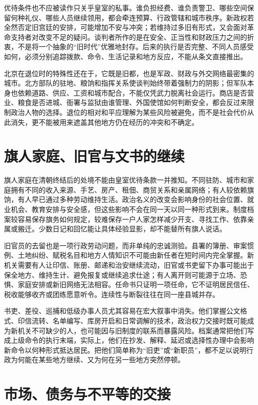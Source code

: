 优待条件也不应被读作只关乎皇室的私事。谁负担经费、谁负责警卫、哪些空间保留何种礼仪、哪些人员继续领用，都会牵连预算、行政管辖和城市秩序。新政权若全然否定旧宫廷的安排，可能增加不安与冲突；若维持过多旧有形式，又会面对革命支持者对改变不足的疑问。谈判者所作的是在安全、正当性和财政压力之间的折衷，不是将一个抽象的“旧时代”优雅地封存。后来的执行是否完整、不同人员感受如何，必须分别追踪拨款、命令、生活记录和地方反应，不能从条文直接推出。

北京在退位时的特殊性还在于，它既是旧都，也是军政、财政与外交网络最密集的城市。北方部队的驻地、粮饷和指挥关系使谈判始终带着强制力的阴影；但军队本身也依赖道路、供应、工资和城市配合，不能仅凭武力脱离社会运行。商店是否营业、粮食是否进城、衙署与监狱由谁管理、外国使馆如何判断安全，都会反过来限制政治人物的选择。退位的相对和平应理解为某些风险被避免，而不是社会代价从此消失，更不能被用来遮盖其他地方仍在经历的冲突和不确定。

\section{旗人家庭、旧官与文书的继续}

旗人家庭在清朝终结后的处境不能由皇室优待条款一并推知。不同驻防、城市和家庭拥有不同的收入来源、手艺、房产、租佃、商贸关系和亲属网络；有人较依赖旗饷，有人早已通过多种劳动维持生活。政治名义的改变会影响身份的社会位置、就业机会、教育安排与安全感，但这些影响不会在同一天以同一种形式到来。制度档案较容易保存旗务如何规定，较难保存一户人家怎样减少开支、寻找工作、依靠亲属或搬迁。少数日记和回忆能让具体经验显影，却不能替所有旗人说话。

旧官员的去留也是一项行政劳动问题，而非单纯的忠诚测验。县署的簿册、审案惯例、土地纠纷、赋税名目和地方人情知识不可能由新任者在短时间内完全掌握。新机关需要有人让印信、账册、邮递和治安继续流动，旧官或书吏留下办事可能出于保全地方、维持生计、避免报复或继续追求仕途；有人离开则可能源于立场、恐惧、家庭安排或新旧网络无法相容。任命书只证明一项任命，它不证明居民信任、税收能够收齐或团练愿意听令。连续性与断裂往往在同一座县城并存。

书吏、差役、巡捕和低级办事人员尤其容易在宏大叙事中消失。他们掌握公文格式、印信流转、名单编写、库房开启和日常调解的技术，政治权力交接时既可能成为新机关不可缺少的人，也可能因与旧制度的联系而暴露风险。档案通常把他们写成上级命令的执行末端，实际上，他们在抄发、解释、延迟或选择性办理中会影响新命令以何种形式抵达居民。把他们简单称为“旧吏”或“新职员”，都不足以说明行政为何能在某些地方继续、又为何在另一些地方突然停顿。

\section{市场、债务与不平等的交接}

